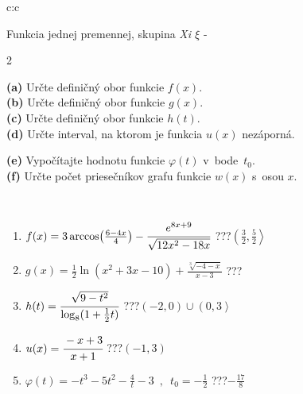 \documentclass[10pt]{report}
\begin{document}
\begin{tabular}{c:c}
\begin{minipage}[c][104.5mm][t]{0.5\linewidth}
\begin{center}
\vspace{7mm}
{\huge Funkcia jednej premennej, skupina \textit{Xi $\xi$} -}\\[5mm]
\begin{minipage}{0.95\linewidth}
\begin{center}
{\small \begin{multicols}{2} \raggedright
\textbf{(a)} Určte definičný obor funkcie \(f(x)\). \\[1mm]
\textbf{(b)} Určte definičný obor funkcie \(g(x)\). \\[1mm]
\textbf{(c)} Určte definičný obor funkcie \(h(t)\). \\[1mm]
\textbf{(d)} Určte interval, na ktorom je funkcia \(u(x)\) nezáporná. \par \columnbreak
\textbf{(e)} Vypočítajte hodnotu funkcie \(\varphi(t)\) v~bode~\(t_0\). \\[1mm]
\textbf{(f)} Určte počet priesečníkov grafu funkcie \(w(x)\) s~osou \(x\). \\[1mm]
\end{multicols}
}
\end{center}
\end{minipage}
\\[4mm]
\begin{minipage}{0.79\linewidth}
\begin{center}
\begin{varwidth}{\linewidth}
\begin{enumerate}
\small
\item $f(x) = 3\arccos\!\left( \frac{6-4x}{4} \right) - \cfrac{e^{8x+9}}{\sqrt{12x^2-18x}}$\quad \dotfill\; ???\;\dotfill \quad $\left(\frac{3}{2} , \frac{5}{2}\right\rangle$
\item $g(x) = \frac{1}{2} \ln{\!(x^2+3x-10)}+\frac{\sqrt[3]{-4-x}}{x-3}$\quad \dotfill\; ???\;\dotfill {}
\item $h(t) = \cfrac{\sqrt{9-t^2}}{\log_8(1+\frac{1}{2}t)}$\quad \dotfill\; ???\;\dotfill \quad $\left(-2 , 0\right)\cup\left(0 , 3\right\rangle$
\item $u(x) = \cfrac{-x+3}{x+1}$\quad \dotfill\; ???\;\dotfill \quad $\left(-1 , 3\right)$
\item $\varphi(t) = -t^3-5t^2-\frac{4}{t}-3 \enspace , \enspace t_0=-\frac{1}{2}$\quad \dotfill\; ???\;\dotfill \quad $-\frac{17}{8}$

\end{enumerate}
\end{varwidth}
\end{center}
\end{minipage}
\end{center}
\end{minipage}
\end{tabular}
\end{document}
